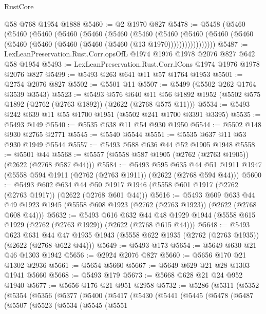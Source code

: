 \begin{lexlean}{RustCore}
\begin{coremodule}
    @58
    @768
    @1954
    @1888
@5460 := @2 @1970 @827
@5478 := @5458
    (@5460
      (@5460
        (@5460
          (@5460
            (@5460
              (@5460
                (@5460
                  (@5460
                    (@5460
                      (@5460 (@5460 (@5460 (@5460 (@5460 (@5460 (@5460 (@13 @1970)))))))))))))))))
@5487 := LexLeanPreservation.Rust.Corr.opsOfL @1974 @1976 @1978 @2076 @827 @642 @58 @1954
@5493 := LexLeanPreservation.Rust.Corr.lCons @1974 @1976 @1978 @2076 @827
@5499 := @5493 @263 @641 @11 @57 @1764 @1953
@5501 := @2754 @2076 @827
@5502 := @5501 @11
@5507 := @5499 (@5502 @262 @1764 @3539 @3543)
@5523 := @5493
    @576
    @640
    @11
    @56
    @1892
    @1952
    (@5502 @575 @1892 (@2762 (@2763 @1892)) (@2622 (@2768 @575 @11)))
@5534 := @5493 @242 @639 @11 @55 @1700 @1951 (@5502 @241 @1700 @3391 @3395)
@5535 := @5493 @149
@5540 := @5535 @638 @11 @54 @930 @1950
@5544 := @5502 @148 @930 @2765 @2771
@5545 := @5540 @5544
@5551 := @5535 @637 @11 @53 @930 @1949 @5544
@5557 := @5493 @588 @636 @44 @52 @1905 @1948
@5558 := @5501 @44
@5568 := @5557 (@5558 @587 @1905 (@2762 (@2763 @1905)) (@2622 (@2768 @587 @44)))
@5584 := @5493
    @595
    @635
    @44
    @51
    @1911
    @1947
    (@5558 @594 @1911 (@2762 (@2763 @1911)) (@2622 (@2768 @594 @44)))
@5600 := @5493
    @602
    @634
    @44
    @50
    @1917
    @1946
    (@5558 @601 @1917 (@2762 (@2763 @1917)) (@2622 (@2768 @601 @44)))
@5616 := @5493
    @609
    @633
    @44
    @49
    @1923
    @1945
    (@5558 @608 @1923 (@2762 (@2763 @1923)) (@2622 (@2768 @608 @44)))
@5632 := @5493
    @616
    @632
    @44
    @48
    @1929
    @1944
    (@5558 @615 @1929 (@2762 (@2763 @1929)) (@2622 (@2768 @615 @44)))
@5648 := @5493
    @623
    @631
    @44
    @47
    @1935
    @1943
    (@5558 @622 @1935 (@2762 (@2763 @1935)) (@2622 (@2768 @622 @44)))
@5649 := @5493 @173
@5654 := @5649 @630 @21 @46 @1303 @1942
@5656 := @2924 @2076 @827
@5660 := @5656 @170 @21 @1302 @2936
@5661 := @5654 @5660
@5667 := @5649 @629 @21 @28 @1303 @1941 @5660
@5668 := @5493 @179
@5673 := @5668 @628 @21 @24 @952 @1940
@5677 := @5656 @176 @21 @951 @2958
@5732 := @5286
    (@5311
      (@5352
        (@5354
          (@5356
            (@5377
              (@5400
                (@5417
                  (@5430
                    (@5441
                      (@5445
                        (@5478
                          (@5487
                            (@5507
                              (@5523
                                (@5534
                                  (@5545
                                    (@5551

\end{coremodule}
\end{lexlean}
